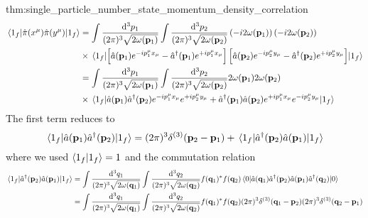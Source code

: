 \begin{delayedproof}{thm:single_particle_number_state_momentum_density_correlation}
	\begin{equation*}
		\begin{split}
			\expval{\hat\pi(x^\mu)\hat\pi(y^\mu)}{1_f}
			&=
			\int\frac{\dd[3]{p_1}}{(2\pi)^3\sqrt{2\omega(\vb{p}_1)}}
			\int\frac{\dd[3]{p_2}}{(2\pi)^3\sqrt{2\omega(\vb{p}_2)}}
			\left(-i2\omega(\vb{p}_1)\right)
			\left(-i2\omega(\vb{p}_2)\right)
			\\
			&\times
			\expval{
				\left[
					\hat{a}(\vb{p}_1)
					e^{-ip_1^\mu x_\mu}
					-
					\hat{a}^\dagger(\vb{p}_1)
					e^{+ip_1^\mu x_\mu}
				\right]
				\left[
					\hat{a}(\vb{p}_2)
					e^{-ip_2^\mu y_\mu}
					-
					\hat{a}^\dagger(\vb{p}_2)
					e^{+ip_2^\mu y_\mu}
				\right]
			}{1_f}
			\\
			&=
			\int\frac{\dd[3]{p_1}}{(2\pi)^3\sqrt{2\omega(\vb{p}_1)}}
			\int\frac{\dd[3]{p_2}}{(2\pi)^3\sqrt{2\omega(\vb{p}_2)}}
			2\omega(\vb{p}_1)
			2\omega(\vb{p}_2)
			\\
			&\times
			\expval{
				\hat{a}(\vb{p}_1)
				\hat{a}^\dagger(\vb{p}_2)
				e^{-ip_1^\mu x_\mu}
				e^{+ip_2^\mu y_\mu}
				+
				\hat{a}^\dagger(\vb{p}_1)
				\hat{a}(\vb{p}_2)
				e^{+ip_1^\mu x_\mu}
				e^{-ip_2^\mu y_\mu}
			}{1_f}
		\end{split}
	\end{equation*}
	The first term reduces to
	\begin{equation*}
		\expval{
			\hat{a}(\vb{p}_1)
			\hat{a}^\dagger(\vb{p}_2)
		}{1_f}
		=
		(2\pi)^3\delta^{(3)}(\vb{p}_2-\vb{p}_1)
		+
		\expval{
			\hat{a}^\dagger(\vb{p}_2)
			\hat{a}(\vb{p}_1)
		}{1_f}
	\end{equation*}
	where we used $\braket{1_f}=1$ and the commutation relation
	\begin{equation*}
		\begin{split}
			\expval{
				\hat{a}^\dagger(\vb{p}_2)
				\hat{a}(\vb{p}_1)
			}{1_f}
			&=
			\int\frac{\dd[3]{q_1}}{(2\pi)^3\sqrt{2\omega(\vb{q}_1)}}
			\int\frac{\dd[3]{q_2}}{(2\pi)^3\sqrt{2\omega(\vb{q}_2)}}
			f(\vb{q}_1)^*
			f(\vb{q}_2)
			\expval{
				\hat{a}(\vb{q}_1)
				\hat{a}^\dagger(\vb{p}_2)
				\hat{a}(\vb{p}_1)
				\hat{a}^\dagger(\vb{q}_2)
			}{0}
			\\
			&=
			\int\frac{\dd[3]{q_1}}{(2\pi)^3\sqrt{2\omega(\vb{q}_1)}}
			\int\frac{\dd[3]{q_2}}{(2\pi)^3\sqrt{2\omega(\vb{q}_2)}}
			f(\vb{q}_1)^*
			f(\vb{q}_2)
			(2\pi)^3\delta^{(3)}(\vb{q}_1-\vb{p}_2)
			(2\pi)^3\delta^{(3)}(\vb{q}_2-\vb{p}_1)
			\\

\end{split}
\end{equation*}
\end{delayedproof}

